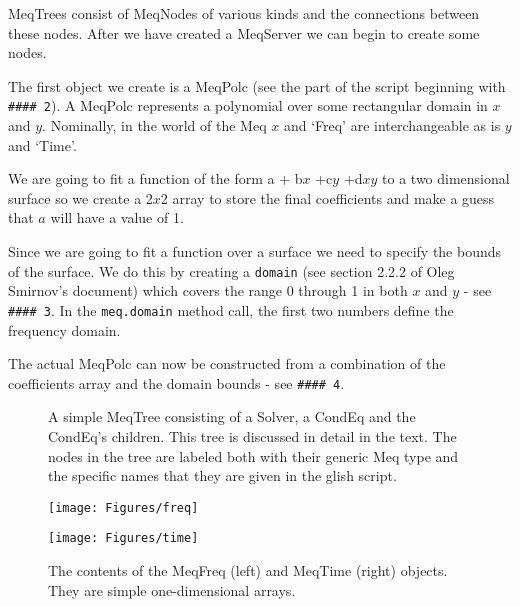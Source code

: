 \documentclass[10pt]{article}
\begin{document}
MeqTrees consist of MeqNodes of various kinds and the connections 
between these nodes. After we have created a MeqServer we can begin
to create some nodes. 

The first object we create is a MeqPolc (see
the part of the script beginning with {\tt \#\#\#\# 2}).
A MeqPolc represents a polynomial over some rectangular domain in $x$ and
$y$. Nominally, in the world of the Meq $x$ and `Freq' are
interchangeable as is $y$ and `Time'.

We are going to fit a function of the form a + b$x$ +c$y$ +d$xy$ to a
two dimensional surface so we create a 2$x$2 array to store the final
coefficients and make a guess that $a$ will have a value of 1.

Since we are going to fit a function over a surface we need to
specify the bounds of the surface. We do this by creating a  {\tt domain}
(see section 2.2.2 of Oleg Smirnov's \cite{smirnov} document) which
covers the range 0 through 1 in both $x$ and $y$ - see {\tt \#\#\#\# 3}. 
In the {\tt meq.domain} method call, the first two numbers define
the frequency domain.

The actual MeqPolc can now be constructed from a combination of the 
coefficients array and the domain bounds - see  {\tt \#\#\#\# 4}.

\begin{figure}
{\par\centering
{}
\par}
\caption {A simple MeqTree consisting of a Solver, a CondEq
and the CondEq's children. This tree is discussed in detail in the
text. The nodes in the tree are labeled both with their generic
Meq type and the specific names that they are given in the glish 
script.} 
\label{fig:tree}
\end{figure}

\begin{figure}
  \centering
  \begin{minipage}[c]{0.5\textwidth}
     \centering \texttt{[image: Figures/freq]}
  \end{minipage}%
  \begin{minipage}[c]{0.5\textwidth}
     \centering \texttt{[image: Figures/time]}
  \end{minipage}
  \caption {The contents of the MeqFreq (left) and MeqTime (right) objects.
  They are simple one-dimensional arrays.} 
  \label{fig:freq}
\end{figure}
\end{document}
